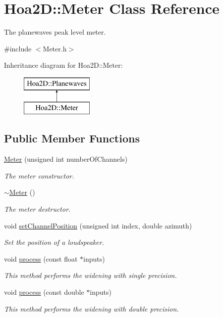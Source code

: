 \hypertarget{class_hoa2_d_1_1_meter}{\section{Hoa2\-D\-:\-:Meter Class Reference}
\label{class_hoa2_d_1_1_meter}
}


The planewaves peak level meter.  




{\ttfamily \#include $<$Meter.\-h$>$}

Inheritance diagram for Hoa2\-D\-:\-:Meter\-:\begin{figure}[H]
\begin{center}
\leavevmode
\includegraphics[height=2.000000cm]{class_hoa2_d_1_1_meter}
\end{center}
\end{figure}
\subsection*{Public Member Functions}
\begin{DoxyCompactItemize}
\item 
\hyperlink{class_hoa2_d_1_1_meter_a14d0584c4d3cd7fbfcbe73b7f9b072ce}{Meter} (unsigned int number\-Of\-Channels)
\begin{DoxyCompactList}\small\item\em The meter constructor. \end{DoxyCompactList}\item 
\hyperlink{class_hoa2_d_1_1_meter_a48276da266f600f4d24db748ff4ca046}{$\sim$\-Meter} ()
\begin{DoxyCompactList}\small\item\em The meter destructor. \end{DoxyCompactList}\item 
void \hyperlink{class_hoa2_d_1_1_meter_a6d6b2cbadbd05f9e731e22cd747f3008}{set\-Channel\-Position} (unsigned int index, double azimuth)
\begin{DoxyCompactList}\small\item\em Set the position of a loudspeaker. \end{DoxyCompactList}\item 
void \hyperlink{class_hoa2_d_1_1_meter_a1b05d443d17a910e7e9cc7b3f81badc6}{process} (const float $\ast$inputs)
\begin{DoxyCompactList}\small\item\em This method performs the widening with single precision. \end{DoxyCompactList}\item 
void \hyperlink{class_hoa2_d_1_1_meter_af523ed430333d4b861b117bda0bc6068}{process} (const double $\ast$inputs)
\begin{DoxyCompactList}\small\item\em This method performs the widening with double precision. \end{DoxyCompactList}\end{DoxyCompactItemize}
